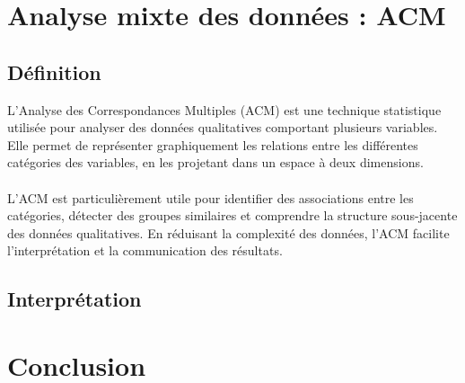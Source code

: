 \documentclass[12pt]{scrartcl}
\begin{document}
                

    \section{Analyse mixte des données : ACM}

        \subsection{Définition}
            L'Analyse des Correspondances Multiples (ACM) est une technique statistique utilisée pour analyser des données qualitatives comportant plusieurs variables. Elle permet de représenter graphiquement les relations entre les différentes catégories des variables, en les projetant dans un espace à deux dimensions.\\\\
            L'ACM est particulièrement utile pour identifier des associations entre les catégories, détecter des groupes similaires et comprendre la structure sous-jacente des données qualitatives. En réduisant la complexité des données, l'ACM facilite l'interprétation et la communication des résultats.

        \subsection{Interprétation}


    \section{Conclusion}
\end{document}
